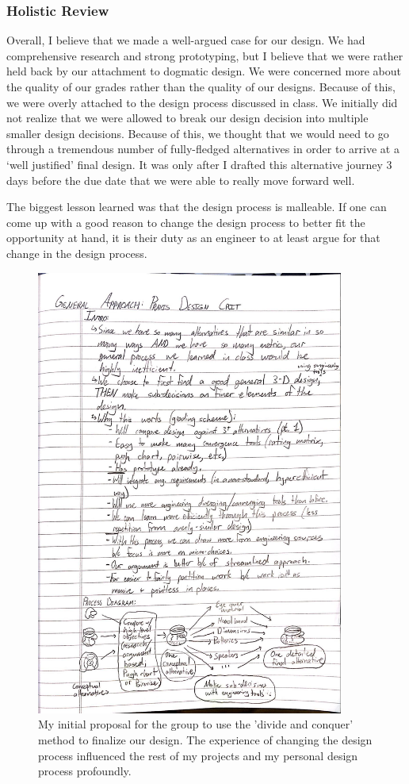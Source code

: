 \documentclass[a4paper,12pt]{article}
\begin{document}
\subsubsection{Holistic Review}
Overall, I believe that we made a well-argued case for our design. We had comprehensive research and strong prototyping, but I believe that we were rather held back by our attachment to dogmatic design. We were concerned more about the quality of our grades rather than the quality of our designs. Because of this, we were overly attached to the design process discussed in class. We initially did not realize that we were allowed to break our design decision into multiple smaller design decisions. Because of this, we thought that we would need to go through a tremendous number of fully-fledged alternatives in order to arrive at a ‘well justified’ final design. It was only after I drafted this alternative journey 3 days before the due date that we were able to really move forward well.

The biggest lesson learned was that the design process is malleable. If one can come up with a good reason to change the design process to better fit the opportunity at hand, it is their duty as an engineer to at least argue for that change in the design process.

\begin{figure}[H]
\centering
\includegraphics[width=0.9\textwidth]{img/image004.jpg}
\caption{My initial proposal for the group to use the 'divide and conquer' method to finalize our design. The experience of changing the design process influenced the rest of my projects and my personal design process profoundly.}
\label{}
\end{figure}
\end{document}
